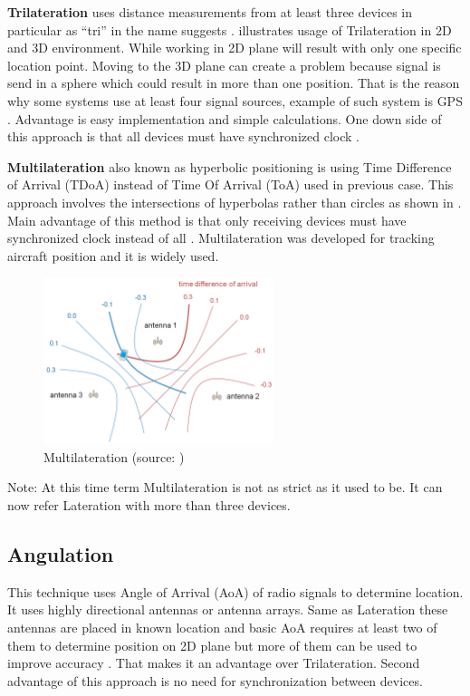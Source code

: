 \textbf{Trilateration} uses distance measurements from at least three devices in particular as \enquote{tri} in the name suggests \cite{RAinWILTaS}.  illustrates usage of Trilateration in 2D and 3D environment. While working in 2D plane will result with only one specific location point. Moving to the 3D plane can create a problem because signal is send in a sphere which could result in more than one position. That is the reason why some systems use at least four signal sources, example of such system is GPS \cite{GNSSGPS}. Advantage is easy implementation and simple calculations. One down side of this approach is that all devices must have synchronized clock \cite{RAinWILTaS}.

\medskip

\textbf{Multilateration} also known as hyperbolic positioning is using Time Difference of Arrival (TDoA) instead of Time Of Arrival (ToA) used in previous case. This approach involves the intersections of hyperbolas rather than circles as shown in . Main advantage of this method is that only receiving devices must have synchronized clock instead of all \cite{PLTaA}. Multilateration was developed for tracking aircraft position and it is widely used.

\begin{figure}[h!]
	\begin{centering}
		\includegraphics[width=0.6\textwidth]{img/multilateration}
		\par\end{centering}
	\caption{Multilateration (source: \cite{HPwAA})\label{fig:Multilateration}}
	\label{fig02c02}
\end{figure}

Note: At this time term Multilateration is not as strict as it used to be. It can now refer Lateration with more than three devices.

\subsection{Angulation}\label{sec:Angulation}
This technique uses Angle of Arrival (AoA) of radio signals to determine location. It uses highly directional antennas or antenna arrays. Same as Lateration these antennas are placed in known location and basic AoA requires at least two of them to determine position on 2D plane but more of them can be used to improve accuracy \cite{RAinWILTaS}. That makes it an advantage over Trilateration. Second advantage of this approach is no need for synchronization between devices.

